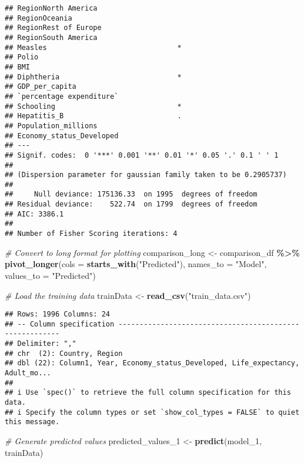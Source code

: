 \documentclass[
]{article}
\newenvironment{Shaded}{\begin{snugshade}}{\end{snugshade}}
\newcommand{\AttributeTok}[1]{\textcolor[rgb]{0.13,0.29,0.53}{#1}}
\newcommand{\CommentTok}[1]{\textcolor[rgb]{0.56,0.35,0.01}{\textit{#1}}}
\newcommand{\FunctionTok}[1]{\textcolor[rgb]{0.13,0.29,0.53}{\textbf{#1}}}
\newcommand{\NormalTok}[1]{#1}
\newcommand{\OtherTok}[1]{\textcolor[rgb]{0.56,0.35,0.01}{#1}}
\newcommand{\SpecialCharTok}[1]{\textcolor[rgb]{0.81,0.36,0.00}{\textbf{#1}}}
\newcommand{\StringTok}[1]{\textcolor[rgb]{0.31,0.60,0.02}{#1}}
\begin{document}
\begin{verbatim}
## RegionNorth America                      
## RegionOceania                            
## RegionRest of Europe                     
## RegionSouth America                      
## Measles                               *  
## Polio                                    
## BMI                                      
## Diphtheria                            *  
## GDP_per_capita                           
## `percentage expenditure`                 
## Schooling                             *  
## Hepatitis_B                           .  
## Population_millions                      
## Economy_status_Developed                 
## ---
## Signif. codes:  0 '***' 0.001 '**' 0.01 '*' 0.05 '.' 0.1 ' ' 1
## 
## (Dispersion parameter for gaussian family taken to be 0.2905737)
## 
##     Null deviance: 175136.33  on 1995  degrees of freedom
## Residual deviance:    522.74  on 1799  degrees of freedom
## AIC: 3386.1
## 
## Number of Fisher Scoring iterations: 4
\end{verbatim}

\begin{Shaded}
\begin{Highlighting}[]
\CommentTok{\# Convert to long format for plotting}
\NormalTok{comparison\_long }\OtherTok{\textless{}{-}}\NormalTok{ comparison\_df }\SpecialCharTok{\%\textgreater{}\%}
  \FunctionTok{pivot\_longer}\NormalTok{(}\AttributeTok{cols =} \FunctionTok{starts\_with}\NormalTok{(}\StringTok{"Predicted"}\NormalTok{), }\AttributeTok{names\_to =} \StringTok{"Model"}\NormalTok{, }\AttributeTok{values\_to =} \StringTok{"Predicted"}\NormalTok{)}

\CommentTok{\# Load the training data}
\NormalTok{trainData }\OtherTok{\textless{}{-}} \FunctionTok{read\_csv}\NormalTok{(}\StringTok{"train\_data.csv"}\NormalTok{)}
\end{Highlighting}
\end{Shaded}

\begin{verbatim}
## Rows: 1996 Columns: 24
## -- Column specification --------------------------------------------------------
## Delimiter: ","
## chr  (2): Country, Region
## dbl (22): Column1, Year, Economy_status_Developed, Life_expectancy, Adult_mo...
## 
## i Use `spec()` to retrieve the full column specification for this data.
## i Specify the column types or set `show_col_types = FALSE` to quiet this message.
\end{verbatim}

\begin{Shaded}
\begin{Highlighting}[]
\CommentTok{\# Generate predicted values}
\NormalTok{predicted\_values\_1 }\OtherTok{\textless{}{-}} \FunctionTok{predict}\NormalTok{(model\_1, trainData)}
\end{Highlighting}
\end{Shaded}
\end{document}
